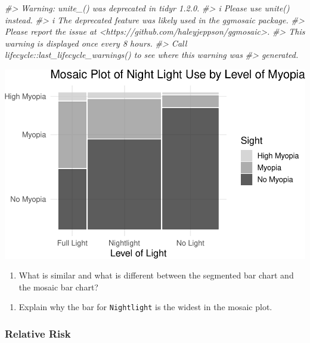 \documentclass[
]{report}
\newenvironment{Shaded}{\begin{snugshade}}{\end{snugshade}}
\newcommand{\CommentTok}[1]{\textcolor[rgb]{0.56,0.35,0.01}{\textit{#1}}}
\providecommand{\tightlist}{%
  \setlength{\itemsep}{0pt}\setlength{\parskip}{0pt}}
\begin{document}
\begin{Shaded}
\begin{Highlighting}[]
\CommentTok{\#\textgreater{} Warning: \textasciigrave{}unite\_()\textasciigrave{} was deprecated in tidyr 1.2.0.}
\CommentTok{\#\textgreater{} i Please use \textasciigrave{}unite()\textasciigrave{} instead.}
\CommentTok{\#\textgreater{} i The deprecated feature was likely used in the ggmosaic package.}
\CommentTok{\#\textgreater{}   Please report the issue at \textless{}https://github.com/haleyjeppson/ggmosaic\textgreater{}.}
\CommentTok{\#\textgreater{} This warning is displayed once every 8 hours.}
\CommentTok{\#\textgreater{} Call \textasciigrave{}lifecycle::last\_lifecycle\_warnings()\textasciigrave{} to see where this warning was}
\CommentTok{\#\textgreater{} generated.}
\end{Highlighting}
\end{Shaded}

\begin{center}\includegraphics[width=0.6\linewidth]{08-A17-EDA-categorical_files/figure-latex/unnamed-chunk-4-1} \end{center}

\begin{enumerate}
\def\labelenumi{\arabic{enumi}.}
\setcounter{enumi}{11}
\tightlist
\item
  What is similar and what is different between the segmented bar chart and the mosaic bar chart?
\end{enumerate}

\vspace{1in}

\begin{enumerate}
\def\labelenumi{\arabic{enumi}.}
\setcounter{enumi}{12}
\tightlist
\item
  Explain why the bar for \texttt{Nightlight} is the widest in the mosaic plot.
\end{enumerate}

\vspace{0.8in}

\subsubsection*{Relative Risk}\label{relative-risk}
\end{document}
